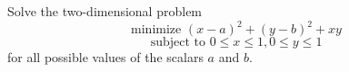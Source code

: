 \begin{proposition}
    Solve the two-dimensional problem
    \[\text{minimize } (x-a)^2+(y-b)^2+xy\]
    \[\text{subject to } 0 \leq x \leq 1, 0 \leq y \leq 1\]
    for all possible values of the scalars \(a\) and \(b\).
\end{proposition}